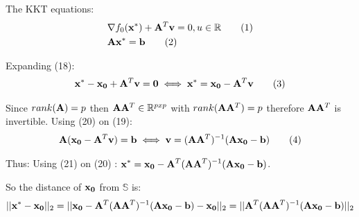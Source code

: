 \documentclass[12pt]{article}
\newcommand\numberthis{\addtocounter{equation}{1}\tag{\theequation}}
\begin{document}
\begin{enumerate}
		The KKT equations:
		\begin{align*}
			&\nabla f_0({\bf x^*})+{\bf A}^T{\bf v} = 0,u\in\mathbb{R}\numberthis\\
			&{\bf A}{\bf x^*}={\bf b} \numberthis
		\end{align*}
	
		Expanding (18):
		\begin{align*}
			{\bf x^*}-{\bf x_0}+{\bf A}^T{\bf v}={\bf 0} \iff {\bf x^*}={\bf x_0}-{\bf A}^T{\bf v}\numberthis
		\end{align*}
		
		Since $rank({\bf A})=p$ then ${\bf A}{\bf A}^T\in \mathbb{R}^{pxp}$ with $rank({\bf A}{\bf A}^T)=p$ therefore  ${\bf A}{\bf A}^T$ is invertible.
		Using (20) on (19):
		\begin{align*}
			{\bf A}({\bf x_0}-{\bf A}^T{\bf v})={\bf b}\iff {\bf v}=({\bf A}{\bf A}^T)^{-1}({\bf A}{\bf x_0}-{\bf b})\numberthis
		\end{align*}
	
		Thus: Using (21) on (20) : $\displaystyle {\bf x^*}={\bf x_0}-{\bf A}^T({\bf A}{\bf A}^T)^{-1}({\bf A}{\bf x_0}-{\bf b})$.
		
		So the distance of ${\bf x_0}$ from $\mathbb{S}$ is: 
		\begin{align*}
			||{\bf x^*}-{\bf x_0}||_2 = ||{\bf x_0}-{\bf A}^T({\bf A}{\bf A}^T)^{-1}({\bf A}{\bf x_0}-{\bf b})-{\bf x_0}||_2=||{\bf A}^T({\bf A}{\bf A}^T)^{-1}({\bf A}{\bf x_0}-{\bf b})||_2
		\end{align*}
	
		
	\end{enumerate}
\end{document}

